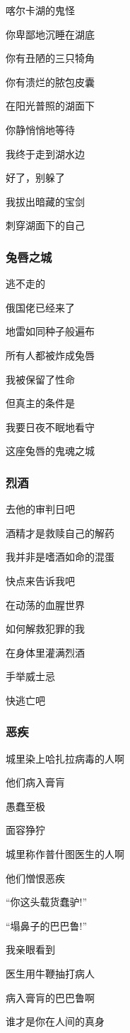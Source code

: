 \documentclass[openany,scheme = chinese, linespread = 1.5]{ctexbook}
\begin{document}
\begin{center}
喀尔卡湖的鬼怪

你卑鄙地沉睡在湖底

你有丑陋的三只犄角

你有溃烂的脓包皮囊

在阳光普照的湖面下

你静悄悄地等待

我终于走到湖水边

好了，别躲了

我拔出暗藏的宝剑

刺穿湖面下的自己
\end{center}

\subsubsection*{兔唇之城}

\begin{center}
逃不走的

俄国佬已经来了

地雷如同种子般遍布

所有人都被炸成兔唇

我被保留了性命

但真主的条件是

我要日夜不眠地看守

这座兔唇的鬼魂之城
\end{center}

\subsubsection*{烈酒}

\begin{center}
去他的审判日吧

酒精才是救赎自己的解药

我并非是嗜酒如命的混蛋

快点来告诉我吧

在动荡的血腥世界

如何解救犯罪的我

在身体里灌满烈酒

手举威士忌

快逃亡吧
\end{center}

\subsubsection*{恶疾}

\begin{center}
城里染上哈扎拉病毒的人啊

他们病入膏肓

愚蠢至极

面容狰狞

城里称作普什图医生的人啊

他们憎恨恶疾

“你这头载货蠢驴!”

“塌鼻子的巴巴鲁!”

我亲眼看到

医生用牛鞭抽打病人

病入膏肓的巴巴鲁啊

谁才是你在人间的真身
\end{center}
\end{document}
